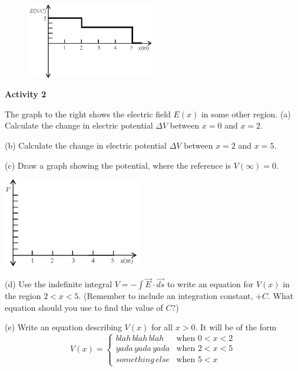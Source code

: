 \pagebreak
\begin{figure}
    \includegraphics[width=0.5\textwidth]{finding_v_from_e/fig3.eps}
\end{figure}

\textbf{Activity 2} 

The graph to the right shows the electric field $E(x)$ in some other region.
(a) Calculate the change in electric potential $\Delta V$ between $x=0$ and $x=2$.
\answerspace{0.8in}

(b) Calculate the change in electric potential $\Delta V$ between $x=2$ and $x=5$.
\answerspace{0.7in}

(c) Draw a graph showing the potential, where the reference is $V(\infty)=0$.
\begin{center}
\includegraphics[width=0.45\textwidth]{finding_v_from_e/fig4.eps}
\end{center}

(d) Use the indefinite integral $V =-\int{\vec{E} \cdot \vec{ds}}$  to write an equation for $V(x)$ in the region $2<x<5$.  (Remember to include an integration constant, $+C$.  What equation should you use to find the value of $C$?)
\answerspace{1.0in}


(e) Write an equation describing $V(x)$ for all $x>0$.  It will be of the form
\begin{displaymath}
V(x) = \begin{cases}
        blah \, blah \, blah  & \textrm{when } 0<x<2\\
        yada \, yada \, yada & \textrm{when }  2<x<5\\
        something \, else & \textrm{when }  5 < x
        \end{cases}
\end{displaymath}

